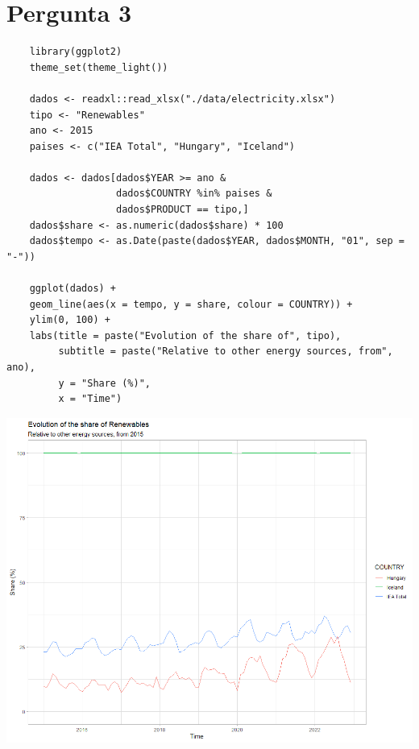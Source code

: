 \documentclass[11pt]{article}
\begin{document}
\section*{Pergunta 3}

\begin{lstlisting}
    library(ggplot2)
    theme_set(theme_light())

    dados <- readxl::read_xlsx("./data/electricity.xlsx")
    tipo <- "Renewables"
    ano <- 2015
    paises <- c("IEA Total", "Hungary", "Iceland")

    dados <- dados[dados$YEAR >= ano & 
                   dados$COUNTRY %in% paises & 
                   dados$PRODUCT == tipo,]
    dados$share <- as.numeric(dados$share) * 100
    dados$tempo <- as.Date(paste(dados$YEAR, dados$MONTH, "01", sep = "-"))

    ggplot(dados) +
    geom_line(aes(x = tempo, y = share, colour = COUNTRY)) +
    ylim(0, 100) +
    labs(title = paste("Evolution of the share of", tipo),
         subtitle = paste("Relative to other energy sources, from", ano),
         y = "Share (%)",
         x = "Time")
\end{lstlisting}

\vspace{14pt}

\begin{center}
    \includegraphics[width=\linewidth]{pergunta_3.png}
\end{center}
\end{document}

